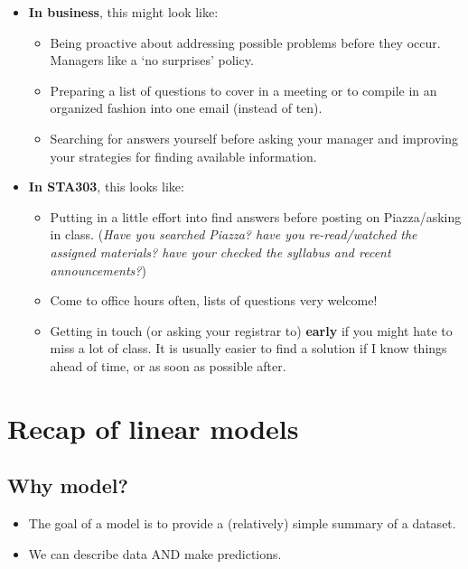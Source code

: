 \documentclass[
  openany]{book}
\providecommand{\tightlist}{%
  \setlength{\itemsep}{0pt}\setlength{\parskip}{0pt}}
\begin{document}
\begin{itemize}
\tightlist
\item
  \textbf{In business}, this might look like:

  \begin{itemize}
  \tightlist
  \item
    Being proactive about addressing possible problems before they occur. Managers like a `no surprises' policy.
  \item
    Preparing a list of questions to cover in a meeting or to compile in an organized fashion into one email (instead of ten).
  \item
    Searching for answers yourself before asking your manager and improving your strategies for finding available information.
  \end{itemize}
\item
  \textbf{In STA303}, this looks like:

  \begin{itemize}
  \tightlist
  \item
    Putting in a little effort into find answers before posting on Piazza/asking in class. (\emph{Have you searched Piazza? have you re-read/watched the assigned materials? have your checked the syllabus and recent announcements?})
  \item
    Come to office hours often, lists of questions very welcome!
  \item
    Getting in touch (or asking your registrar to) \textbf{early} if you might hate to miss a lot of class. It is usually easier to find a solution if I know things ahead of time, or as soon as possible after.
  \end{itemize}
\end{itemize}

\hypertarget{recap-of-linear-models}{%
\section{Recap of linear models}\label{recap-of-linear-models}}

\hypertarget{why-model}{%
\subsection{Why model?}\label{why-model}}

\begin{itemize}
\tightlist
\item
  The goal of a model is to provide a (relatively) simple summary of a dataset.
\item
  We can describe data AND make predictions.
\end{itemize}
\end{document}
